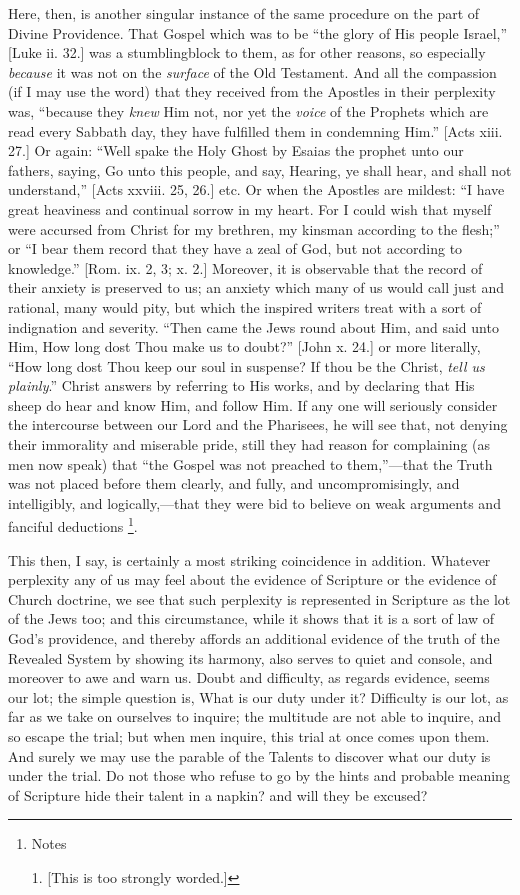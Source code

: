 Here, then, is another singular instance of the same procedure on
the part of Divine Providence. That Gospel which was to be ``the
glory of His people Israel,'' [Luke ii. 32.] was a stumblingblock
to them, as for other reasons, so especially \emph{because} it was not
on the \emph{surface} of the Old Testament. And all the compassion (if
I may use the word) that they received from the Apostles in their
perplexity was, ``because they \emph{knew} Him not, nor yet the \emph{voice}
of the Prophets which are read every Sabbath day, they have fulfilled
them in condemning Him.'' [Acts xiii. 27.] Or again: ``Well
spake the Holy Ghost by Esaias the prophet unto our fathers, saying,
Go unto this people, and say, Hearing, ye shall hear, and shall not
understand,'' [Acts xxviii. 25, 26.] etc. Or when the Apostles are
mildest: ``I have great heaviness and continual sorrow in my
heart. For I could wish that myself were accursed from Christ for my
brethren, my kinsman according to the flesh;'' or ``I bear
them record that they have a zeal of God, but not according to
knowledge.'' [Rom. ix. 2, 3; x. 2.] Moreover, it is observable
that the record of their anxiety is preserved to us; an anxiety
which many of us would call just and rational, many would pity, but
which the inspired writers treat with a sort of indignation and
severity. ``Then came the Jews round about Him, and said unto Him,
How long dost Thou make us to doubt?'' [John x. 24.] or more
literally, ``How long dost Thou keep our soul in suspense? If thou
be the Christ, \emph{tell us plainly}.'' Christ answers by referring to
His works, and by declaring that His sheep do hear and know Him, and
follow Him. If any one will seriously consider the intercourse between
our Lord and the Pharisees, he will see that, not denying their
immorality and miserable pride, still they had reason for complaining
(as men now speak) that ``the Gospel was not preached to
them,''—that the Truth was not placed before them clearly, and
fully, and uncompromisingly, and intelligibly, and logically,—that
they were bid to believe on weak arguments and fanciful deductions \footnote{Notes

1. [This is too strongly worded.]}.

This then, I say, is certainly a most striking coincidence in
addition. Whatever perplexity any of us may feel about the evidence of
Scripture or the evidence of Church doctrine, we see that such
perplexity is represented in Scripture as the lot of the Jews too; and
this circumstance, while it shows that it is a sort of law of God's
providence, and thereby affords an additional evidence of the truth of
the Revealed System by showing its harmony, also serves to quiet and
console, and moreover to awe and warn us. Doubt and difficulty, as
regards evidence, seems our lot; the simple question is, What is our
duty under it? Difficulty is our lot, as far as we take on ourselves
to inquire; the multitude are not able to inquire, and so escape the
trial; but when men inquire, this trial at once comes upon them. And
surely we may use the parable of the Talents to discover what
our duty is under the trial. Do not those who refuse to go by the
hints and probable meaning of Scripture hide their talent in a napkin?
and will they be excused?

